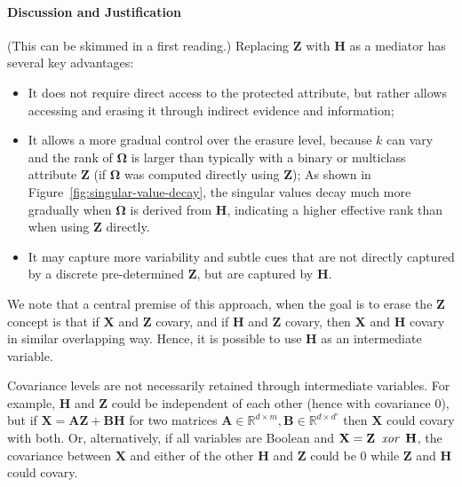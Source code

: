 \documentclass[11pt]{article}
\newcommand{\rv}[1]{\mathbf{#1}}
\newcommand{\mymat}[1]{\bm{#1}}
\begin{document}
\paragraph{Discussion and Justification}  (This  can be skimmed in a first reading.) Replacing $\rv{Z}$ with $\rv{H}$ as a mediator has several key advantages:

\begin{itemize}[topsep=0pt,noitemsep,parsep=0pt,leftmargin=*]

\item It does not require direct access to the protected attribute, but rather allows accessing and erasing it through indirect evidence and information;

\item It allows a more gradual control over the erasure level, because $k$ can vary and the rank of $\mymat{\Omega}$ is larger than typically with a binary or multiclass attribute $\mymat{Z}$ (if $\mymat{\Omega}$ was computed
directly using $\mymat{Z}$); As shown in Figure~\ref{fig:singular-value-decay}, the singular values decay much more gradually when $\mymat{\Omega}$ is derived from $\rv{H}$, indicating a higher effective rank than when using $\rv{Z}$ directly.


\item It may capture more variability and subtle cues that are not directly captured by a discrete pre-determined $\rv{Z}$, but are captured by $\rv{H}$.
    
\end{itemize}

We note that a central premise of this approach, when the goal
is to erase the $\rv{Z}$ concept is that if $\rv{X}$ and $\rv{Z}$ covary, and if $\rv{H}$ and $\rv{Z}$ covary, then $\rv{X}$  and $\rv{H}$ covary in similar overlapping way. Hence, it is possible to use $\rv{H}$ as an intermediate variable.

Covariance levels are not necessarily retained through intermediate variables. For example, $\rv{H}$ and $\rv{Z}$  could be independent of each other (hence with covariance $0$), but if
$\rv{X} = \mymat{A} \rv{Z} + \mymat{B} \rv{H}$ for  two matrices $\mymat{A} \in \mathbb{R}^{d \times m}, \mymat{B} \in \mathbb{R}^{d \times d'}$ then $\rv{X}$ could covary with both. Or, alternatively, if all variables are Boolean and $\rv{X} = \rv{Z} \textit{\, xor\,  } \rv{H}$, the covariance between $\rv{X}$ and either of the other $\rv{H}$ and $\rv{Z}$ could be $0$ while $\rv{Z}$ and $\rv{H}$ could covary.
\end{document}

